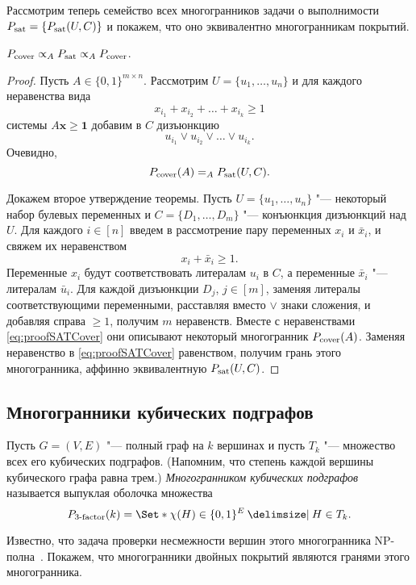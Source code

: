 Рассмотрим теперь семейство всех многогранников задачи о выполнимости $P_{\textup{sat}} = \{P_{\textup{sat}}(U,C)\}$ и покажем, что оно эквивалентно многогранникам покрытий.

\begin{theorem}
$P_{\textup{cover}} \propto_A P_{\textup{sat}} \propto_A P_{\textup{cover}}$.
\end{theorem}
\begin{proof}
Пусть $A \in \{0,1\}^{m\times n}$.
Рассмотрим $U=\{u_1,\dots,u_n\}$ и для каждого неравенства вида
\[
x_{i_1}+x_{i_2}+\dots+x_{i_k} \ge 1
\]
системы $A\bm{x} \ge \bm{1}$ добавим в $C$ дизъюнкцию
\[
u_{i_1} \vee u_{i_2} \vee \dots \vee u_{i_k}.
\]
Очевидно,
\[
P_{\textup{cover}}(A) =_A P_{\textup{sat}}(U,C).
\]

Докажем второе утверждение теоремы.
Пусть $U=\{u_1,\dots,u_n\}$ "--- некоторый набор булевых переменных и $C=\{D_1,\dots,D_m\}$ "--- конъюнкция дизъюнкций над $U$.
Для каждого $i\in[n]$ введем в рассмотрение пару переменных $x_i$ и $\bar{x}_i$,
и свяжем их неравенством 
\begin{equation}
\label{eq:proofSATCover}
x_i + \bar{x}_i \ge 1.
\end{equation}
Переменные $x_i$ будут соответствовать литералам $u_i$ в $C$, а переменные $\bar{x}_i$ "--- литералам $\bar{u}_i$.
Для каждой дизъюнкции $D_j$, $j\in[m]$, заменяя литералы соответствующими переменными, расставляя вместо $\vee$ знаки сложения,
и добавляя справа ${} \ge 1$, получим $m$ неравенств.
Вместе с неравенствами \eqref{eq:proofSATCover} они описывают некоторый многогранник $P_{\textup{cover}}(A)$.
Заменяя неравенство в \eqref{eq:proofSATCover} равенством, получим грань этого многогранника,
аффинно эквивалентную $P_{\textup{sat}}(U,C)$.
\end{proof}

\subsection{Многогранники кубических подграфов}

Пусть $G=(V,E)$ "--- полный граф на $k$ вершинах и пусть $T_k$ "--- множество всех его кубических подграфов. (Напомним, что степень каждой вершины кубического графа равна трем.)
\emph{Многогранником кубических подграфов} называется выпуклая оболочка множества 
\begin{equation*}
\label{def:Cubic}
\Cubic(k) = \Set*{\chi(H)\in\{0,1\}^E \given H \in T_k}.
\end{equation*}

Известно, что задача проверки несмежности вершин этого многогранника NP-полна~\cite{Bondarenko:1996}.
Покажем, что многогранники двойных покрытий являются гранями этого многогранника.

